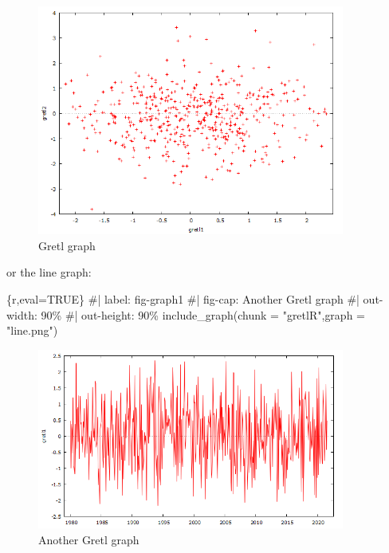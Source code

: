 \documentclass[
  letterpaper,
  DIV=11,
  numbers=noendperiod]{scrartcl}
\newenvironment{Shaded}{\begin{snugshade}}{\end{snugshade}}
\newcommand{\AttributeTok}[1]{\textcolor[rgb]{0.40,0.45,0.13}{#1}}
\newcommand{\CommentTok}[1]{\textcolor[rgb]{0.37,0.37,0.37}{#1}}
\newcommand{\FunctionTok}[1]{\textcolor[rgb]{0.28,0.35,0.67}{#1}}
\newcommand{\InformationTok}[1]{\textcolor[rgb]{0.37,0.37,0.37}{#1}}
\newcommand{\NormalTok}[1]{\textcolor[rgb]{0.00,0.23,0.31}{#1}}
\newcommand{\StringTok}[1]{\textcolor[rgb]{0.13,0.47,0.30}{#1}}
\begin{document}
\begin{figure}[H]

{\centering \includegraphics[width=0.9\textwidth,height=0.9\textheight]{gretlR/gretlR/scatter.png}

}

\caption{\label{fig-graph}Gretl graph}

\end{figure}

or the line graph:

\begin{Shaded}
\begin{Highlighting}[]
\InformationTok{\textasciigrave{}\textasciigrave{}\textasciigrave{}\{r,eval=TRUE\}}
\CommentTok{\#| label: fig{-}graph1}
\CommentTok{\#| fig{-}cap: Another Gretl graph}
\CommentTok{\#| out{-}width: 90\%}
\CommentTok{\#| out{-}height: 90\%}
\FunctionTok{include\_graph}\NormalTok{(}\AttributeTok{chunk =} \StringTok{"gretlR"}\NormalTok{,}\AttributeTok{graph =} \StringTok{"line.png"}\NormalTok{)}
\InformationTok{\textasciigrave{}\textasciigrave{}\textasciigrave{}}
\end{Highlighting}
\end{Shaded}

\begin{figure}[H]

{\centering \includegraphics[width=0.9\textwidth,height=0.9\textheight]{gretlR/gretlR/line.png}

}

\caption{\label{fig-graph1}Another Gretl graph}

\end{figure}
\end{document}
